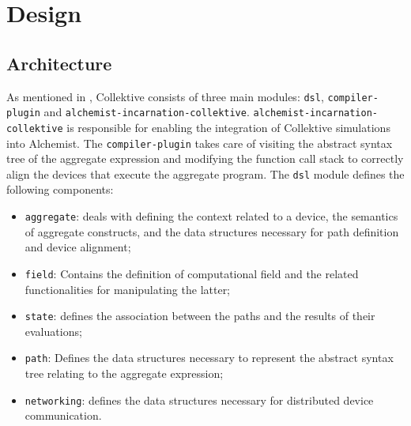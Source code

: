 
\chapter{Design}
\label{chap:design}

\section{Architecture}

As mentioned in , Collektive consists of three main modules: \texttt{dsl}, \texttt{compiler-plugin} and \texttt{alchemist-incarnation-collektive}. \texttt{alchemist-incarnation-collektive} is responsible for enabling the integration of Collektive simulations into Alchemist. The \texttt{compiler-plugin} takes care of visiting the abstract syntax tree of the aggregate expression and modifying the function call stack to correctly align the devices that execute the aggregate program. The \texttt{dsl} module defines the following components:
\begin{itemize}
    \item \texttt{aggregate}: deals with defining the context related to a device, the semantics of aggregate constructs, and the data structures necessary for path definition and device alignment;
    \item \texttt{field}: Contains the definition of computational field and the related functionalities for manipulating the latter;
    \item \texttt{state}: defines the association between the paths and the results of their evaluations;
    \item \texttt{path}: Defines the data structures necessary to represent the abstract syntax tree relating to the aggregate expression;
    \item \texttt{networking}: defines the data structures necessary for distributed device communication.
\end{itemize}

